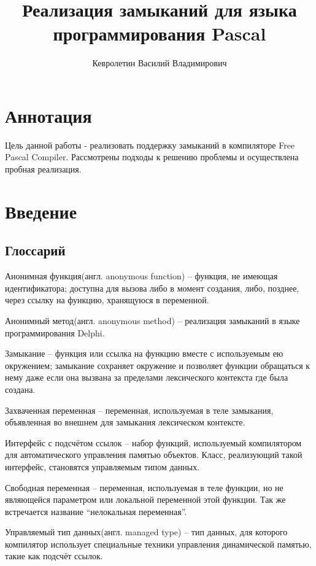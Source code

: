 \documentclass{imcs}
\title{Реализация замыканий для языка программирования Pascal}
\author{Кевролетин Василий Владимирович}
\begin{document}
\maketitle

\tableofcontents
\pagebreak

\section*{Аннотация}
Цель данной работы - реализовать поддержку замыканий в компиляторе Free Pascal Compiler.
Рассмотрены подходы к решению проблемы и осуществлена пробная реализация.

\pagebreak

\section{Введение}
\subsection{Глоссарий}

Анонимная функция(англ. anonymous function) -- функция, не имеющая идентификатора; доступна для
вызова либо в момент создания, либо, позднее, через ссылку на функцию,
хранящуюся в переменной.

Анонимный метод(англ. anonymous method) -- реализация замыканий в языке программирования Delphi\cite{anonymmethods}. 

Замыкание -- функция или ссылка на функцию вместе с используемым ею
окружением; замыкание сохраняет окружение и позволяет функции
обращаться к нему даже если она вызвана за пределами лексического
контекста где была создана.

Захваченная переменная -- переменная, используемая в теле замыкания,
объявленная во внешнем для замыкания лексическом контексте.

Интерфейс с подсчётом ссылок -- набор функций, используемый компилятором для
автоматического управления памятью объектов. Класс, реализующий такой интерфейс,
становятся управляемым типом данных.

Свободная переменная -- переменная, используемая в теле функции, но не
являющейся параметром или локальной переменной этой функции. Так же встречается название
``нелокальная переменная''.

Управляемый тип данных(англ. managed type) -- тип данных, для которого компилятор
использует специальные техники управления динамической памятью,
такие как подсчёт ссылок\cite{delhpimanged}.
\end{document}
